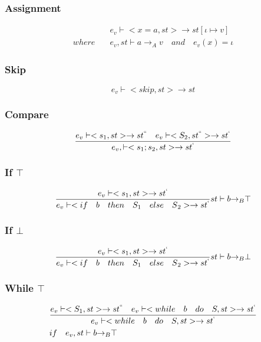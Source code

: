 \subsubsection{Assignment}
\begin{align*}
	&{ e }_{ v }\vdash <x=a,st>\rightarrow st[\iota \mapsto v]\\
	where\quad &{ e }_{ v },st\vdash a{ \rightarrow  }_{ A }v\quad and\quad  { e }_{ v }(x)=\iota 
\end{align*}


\subsubsection{Skip}
\begin{equation}
	{ e }_{ v }\vdash <skip,st>\rightarrow st
\end{equation}


\subsubsection{Compare}
\begin{equation}
	\frac { { e }_{ v }\vdash <{ s }_{ 1 },st>\rightarrow { st }^{ `` }\quad { e }_{ v }\vdash <{ S }_{ 2 },{ st }^{ `` }>\rightarrow { st }^{ ` } }{ { e }_{ v },\vdash <{ s }_{ 1 };{ s }_{ 2 },st>\rightarrow { st }^{ ` } } 
\end{equation}


\subsubsection{If $\top$}
\begin{equation}
	\frac { { e }_{ v }\vdash <{ s }_{ 1 },st>\rightarrow { st }^{ ` } }{ { e }_{ v }\vdash <if\quad b\quad then\quad { S }_{ 1 }\quad else{ \quad S }_{ 2 }>\rightarrow { st }^{ ` } } st\vdash b{ \rightarrow  }_{ B }\top 
\end{equation}

\subsubsection{If $\bot$}
\begin{equation}
	\frac { { e }_{ v }\vdash <{ s }_{ 1 },st>\rightarrow { st }^{ ` } }{ { e }_{ v }\vdash <if\quad b\quad then\quad { S }_{ 1 }\quad else{ \quad S }_{ 2 }>\rightarrow { st }^{ ` } } st\vdash b{ \rightarrow  }_{ B }\bot 
\end{equation}


\subsubsection{While $\top$}
\begin{align*}
	&\frac { { e }_{ v }\vdash <{ S }_{ 1 },st>\rightarrow { st }^{ `` }\quad { e }_{ v }\vdash <while\quad b\quad do\quad S,st>\rightarrow { st }^{ ` } }{ { e }_{ v }\vdash <while\quad b\quad do\quad S,st>\rightarrow { st }^{ ` } }\\
	&if\quad { e }_{ v },st\vdash b{ \rightarrow  }_{ B }\top 
\end{align*}


